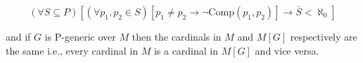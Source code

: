 $$(\forall S \subseteq P)[(\forall p_1, p_2 \in S)[p_1 \neq p_2 \rightarrow \neg \text{Comp}(p_1, p_2)] \rightarrow \bar{S} < \aleph_0]$$

and if $G$ is P-generic over $M$ then the cardinals in $M$ and $M[G]$ respectively are the same i.e., every cardinal in $M$ is a cardinal in $M[G]$ and vice versa.
